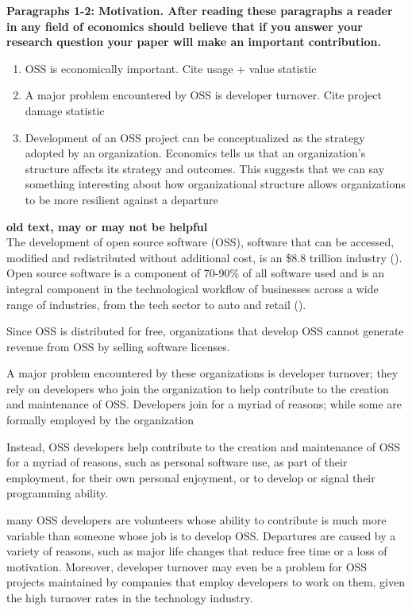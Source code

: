 \documentclass[source/paper/main.tex]{subfiles}
\begin{document}
\textbf{Paragraphs 1-2: Motivation. After reading these paragraphs a reader in any field of economics should believe that if you answer your research question your paper will make an important contribution.}

\begin{enumerate}
    \item OSS is economically important. Cite usage + value statistic
    \item A major problem encountered by OSS is developer turnover. Cite project damage statistic 
    \item Development of an OSS project can be conceptualized as the strategy adopted by an organization. Economics tells us that an organization's structure affects its strategy and outcomes. This suggests that we can say something interesting about how organizational structure allows organizations to be more resilient against a departure
\end{enumerate}

\textbf{old text, may or may not be helpful} \\
The development of open source software (OSS), software that can be accessed, modified and redistributed without additional cost, is an \$8.8 trillion industry (\cite{hoffmann_value_2024}). Open source software is a component of 70-90\% of all software used and is an integral component in the technological workflow of businesses across a wide range of industries, from the tech sector to auto and retail (\cite{nagle_open_2017}). 


Since OSS is distributed for free, organizations that develop OSS cannot generate revenue from OSS by selling software licenses. 


A major problem encountered by these organizations is developer turnover; they rely on developers who join the organization to help contribute to the creation and maintenance of OSS. Developers join for a myriad of reasons; while some are formally employed by the organization 


Instead, OSS developers help contribute to the creation and maintenance of OSS for a myriad of reasons, such as personal software use, as part of their employment, for their own personal enjoyment, or to develop or signal their programming ability. 


many OSS developers are volunteers whose ability to contribute is much more variable than someone whose job is to develop OSS. Departures are caused by a variety of reasons, such as major life changes that reduce free time or a loss of motivation. Moreover, developer turnover may even be a problem for OSS projects maintained by companies that employ developers to work on them, given the high turnover rates in the technology industry. 
\end{document}
